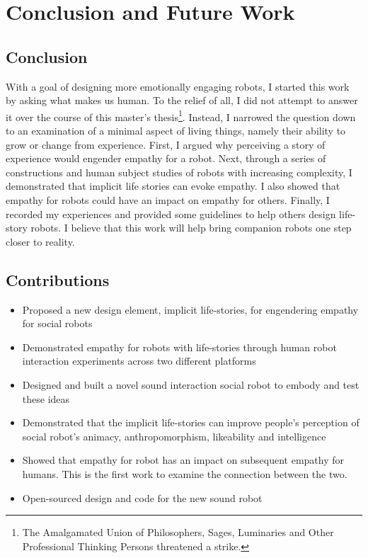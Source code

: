 \chapter{Conclusion and Future Work}
\label{chap_final}

\section{Conclusion}

With a goal of designing more emotionally engaging robots, I started this work by asking what makes us human. To the relief of all, I did not attempt to answer it over the course of this master's thesis\footnote{The Amalgamated Union of Philosophers, Sages, Luminaries and Other Professional Thinking Persons threatened a strike.}. Instead, I narrowed the question down to an examination of a minimal aspect of living things, namely their ability to grow or change from experience. First, I argued why perceiving a story of experience would engender empathy for a robot. Next, through a series of constructions and human subject studies of robots with increasing complexity, I demonstrated that implicit life stories can evoke empathy. I  also showed that empathy for robots could have an impact on empathy for others. Finally, I recorded my experiences and provided some guidelines to help others design life-story robots. I believe that this work will help bring companion robots one step closer to reality. 

\section{Contributions}


\begin{itemize}
\item Proposed a new design element, implicit life-stories, for engendering empathy for social robots
\item Demonstrated empathy for robots with life-stories through human robot interaction experiments across two different platforms
\item Designed and built a novel sound interaction social robot to embody and test these ideas
\item Demonstrated that the implicit life-stories can improve people's perception of social robot's animacy, anthropomorphism, likeability and intelligence
\item Showed that empathy for robot has an impact on subsequent empathy for humans. This is the first work to examine the connection between the two.
\item Open-sourced design and code for the new sound robot
\end{itemize}


